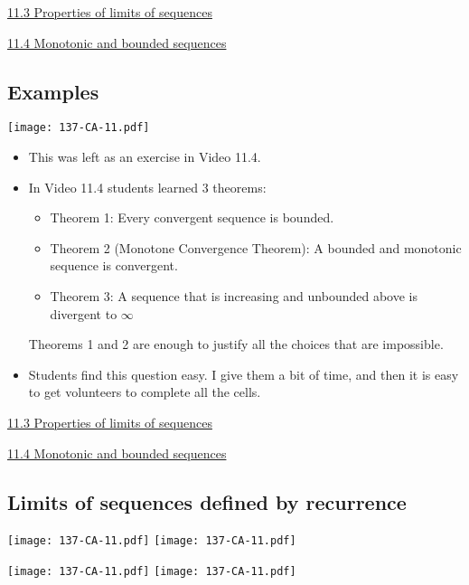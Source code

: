 \documentclass[11pt]{article}
\newcommand{\nl}{\hfill \vspace{-1.1\baselineskip}} %
\newcommand{\viii}{\hspace{8mm} \href{https://www.youtube.com/watch?v=xuNRMkzSzZY&list=PLlwePzQY_wW_yFyXauToZNFNhhufzioP2&index=3}{11.3 Properties of limits of sequences}}
\newcommand{\viv}{\hspace{8mm} \href{https://www.youtube.com/watch?v=J8uZJ9by0ys&list=PLlwePzQY_wW_yFyXauToZNFNhhufzioP2&index=4}{11.4 Monotonic and bounded sequences}}
\begin{document}
\begin{videos}
\viii

\viv
\end{videos}

\newpage
\subsection{Examples}

\begin{center}
{ \texttt{[image: 137-CA-11.pdf]}} 
\end{center}

\begin{comments}
\nl
	\begin{itemize}
		\item  This was left as an exercise in Video 11.4.
		
		\item In Video 11.4 students learned 3 theorems:
			\begin{itemize}
				\item  Theorem 1:  Every convergent sequence is bounded.
				\item  Theorem 2 (Monotone Convergence Theorem): A bounded and monotonic sequence is convergent.
				\item  Theorem 3: A sequence that is increasing and unbounded above is divergent to $\infty$
			\end{itemize}
			Theorems 1 and 2 are enough to justify all the choices that are impossible.

		\item Students find this question easy.  I give them a bit of time, and then it is easy to get volunteers to complete all the cells.
	\end{itemize}
\end{comments}

\begin{videos}
\viii

\viv
\end{videos}

\newpage
\subsection{Limits of sequences defined by recurrence} \label{recurrence}

\begin{center}
{ \texttt{[image: 137-CA-11.pdf]}} \quad
{ \texttt{[image: 137-CA-11.pdf]}} 

{ \texttt{[image: 137-CA-11.pdf]}}  \quad
{ \texttt{[image: 137-CA-11.pdf]}} 
\end{center}
\end{document}
